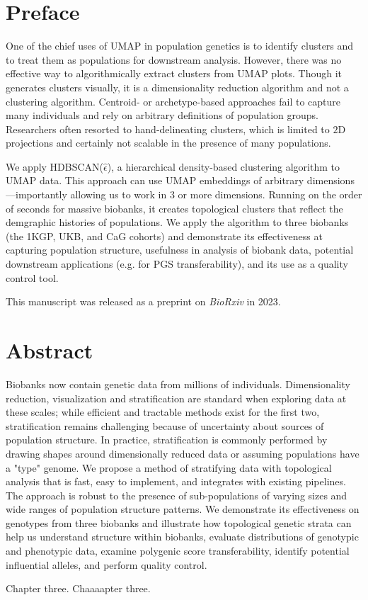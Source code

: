 \setcounter{section}{-1}

\section{Preface}

One of the chief uses of UMAP in population genetics is to identify clusters and to treat them as populations for downstream analysis. However, there was no effective way to algorithmically extract clusters from UMAP plots. Though it generates clusters visually, it is a dimensionality reduction algorithm and not a clustering algorithm. Centroid- or archetype-based approaches fail to capture many individuals and rely on arbitrary definitions of population groups. Researchers often resorted to hand-delineating clusters, which is limited to $2$D projections and certainly not scalable in the presence of many populations.

We apply HDBSCAN($\hat{\epsilon}$), a hierarchical density-based clustering algorithm to UMAP data. This approach can use UMAP embeddings of arbitrary dimensions---importantly allowing us to work in $3$ or more dimensions. Running on the order of seconds for massive biobanks, it creates topological clusters that reflect the demgraphic histories of populations. We apply the algorithm to three biobanks (the 1KGP, UKB, and CaG cohorts) and demonstrate its effectiveness at capturing population structure, usefulness in analysis of biobank data, potential downstream applications (e.g. for PGS transferability), and its use as a quality control tool.

This manuscript was released as a preprint on \textit{BioRxiv} in 2023.

\clearpage

\section{Abstract}

Biobanks now contain genetic data from millions of individuals. Dimensionality reduction, visualization and stratification are standard when exploring data at these scales; while efficient and tractable methods exist for the first two, stratification remains challenging because of uncertainty about sources of population structure. In practice, stratification is commonly performed by drawing shapes around dimensionally reduced data or assuming populations have a "type" genome. We propose a method of stratifying data with topological analysis that is fast, easy to implement, and integrates with existing pipelines. The approach is robust to the presence of sub-populations of varying sizes and wide ranges of population structure patterns. We demonstrate its effectiveness on genotypes from three biobanks and illustrate how topological genetic strata can help us understand structure within biobanks, evaluate distributions of genotypic and phenotypic data, examine polygenic score transferability, identify potential influential alleles, and perform quality control.

Chapter three. Chaaaapter three.\citep{novembre2008europe}
